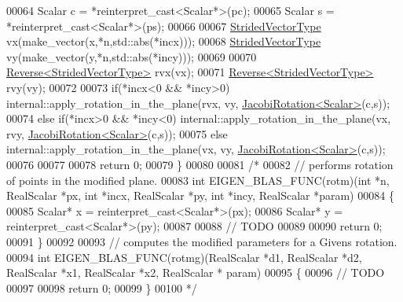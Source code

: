 \begin{DoxyCode}
00064   Scalar c = *\textcolor{keyword}{reinterpret\_cast<}Scalar*\textcolor{keyword}{>}(pc);
00065   Scalar s = *\textcolor{keyword}{reinterpret\_cast<}Scalar*\textcolor{keyword}{>}(ps);
00066 
00067   \hyperlink{group___core___module_class_eigen_1_1_map}{StridedVectorType} vx(make\_vector(x,*n,std::abs(*incx)));
00068   \hyperlink{group___core___module_class_eigen_1_1_map}{StridedVectorType} vy(make\_vector(y,*n,std::abs(*incy)));
00069 
00070   \hyperlink{group___core___module_class_eigen_1_1_reverse}{Reverse<StridedVectorType>} rvx(vx);
00071   \hyperlink{group___core___module_class_eigen_1_1_reverse}{Reverse<StridedVectorType>} rvy(vy);
00072 
00073        \textcolor{keywordflow}{if}(*incx<0 && *incy>0) internal::apply\_rotation\_in\_the\_plane(rvx, vy, 
      \hyperlink{group___jacobi___module_class_eigen_1_1_jacobi_rotation}{JacobiRotation<Scalar>}(c,s));
00074   \textcolor{keywordflow}{else} \textcolor{keywordflow}{if}(*incx>0 && *incy<0) internal::apply\_rotation\_in\_the\_plane(vx, rvy, 
      \hyperlink{group___jacobi___module_class_eigen_1_1_jacobi_rotation}{JacobiRotation<Scalar>}(c,s));
00075   \textcolor{keywordflow}{else}                        internal::apply\_rotation\_in\_the\_plane(vx, vy,  
      \hyperlink{group___jacobi___module_class_eigen_1_1_jacobi_rotation}{JacobiRotation<Scalar>}(c,s));
00076 
00077 
00078   \textcolor{keywordflow}{return} 0;
00079 \}
00080 
00081 \textcolor{comment}{/*}
00082 \textcolor{comment}{// performs rotation of points in the modified plane.}
00083 \textcolor{comment}{int EIGEN\_BLAS\_FUNC(rotm)(int *n, RealScalar *px, int *incx, RealScalar *py, int *incy, RealScalar *param)}
00084 \textcolor{comment}{\{}
00085 \textcolor{comment}{  Scalar* x = reinterpret\_cast<Scalar*>(px);}
00086 \textcolor{comment}{  Scalar* y = reinterpret\_cast<Scalar*>(py);}
00087 \textcolor{comment}{}
00088 \textcolor{comment}{  // TODO}
00089 \textcolor{comment}{}
00090 \textcolor{comment}{  return 0;}
00091 \textcolor{comment}{\}}
00092 \textcolor{comment}{}
00093 \textcolor{comment}{// computes the modified parameters for a Givens rotation.}
00094 \textcolor{comment}{int EIGEN\_BLAS\_FUNC(rotmg)(RealScalar *d1, RealScalar *d2, RealScalar *x1, RealScalar *x2, RealScalar *
      param)}
00095 \textcolor{comment}{\{}
00096 \textcolor{comment}{  // TODO}
00097 \textcolor{comment}{}
00098 \textcolor{comment}{  return 0;}
00099 \textcolor{comment}{\}}
00100 \textcolor{comment}{*/}
\end{DoxyCode}
